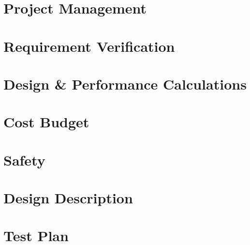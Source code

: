 \documentclass[10pt, a4paper]{article}
\begin{document}
\section{Project Management} %

\newpage

\section{Requirement Verification} %

\newpage

\section{Design \& Performance Calculations} %


\section{Cost Budget} %


\section{Safety} %


\section{Design Description} %

\newpage

\section{Test Plan} %



\end{document}
